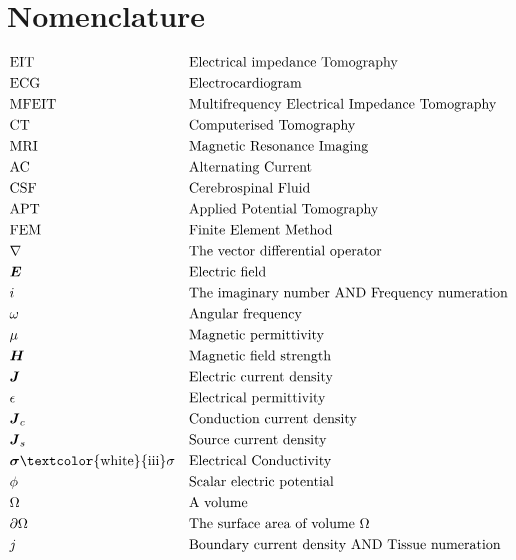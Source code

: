 
\chapter*{Nomenclature}
\begin{align*}
	&\text{EIT} &&\text{Electrical impedance Tomography}\\
	&\text{ECG} &&\text{Electrocardiogram}\\
	&\text{MFEIT} &&\text{Multifrequency Electrical Impedance Tomography}\\
	&\text{CT} &&\text{Computerised Tomography}\\
	&\text{MRI} &&\text{Magnetic Resonance Imaging}\\
	&\text{AC} &&\text{Alternating Current}\\
	&\text{CSF} &&\text{Cerebrospinal Fluid}\\
	&\text{APT} &&\text{Applied Potential Tomography}\\
	&\text{FEM} &&\text{Finite Element Method}\\
	&\nabla &&\text{The vector differential operator}\\
	&\boldsymbol{E} &&\text{Electric field}\\
	&i &&\text{The imaginary number AND Frequency numeration}\\
	&\omega &&\text{Angular frequency}\\
	&\mu &&\text{Magnetic permittivity}\\
	&\boldsymbol{H} &&\text{Magnetic field strength}\\
	&\boldsymbol{J} &&\text{Electric current density}\\
	&\epsilon &&\text{Electrical permittivity}\\
	&\boldsymbol{J}_c &&\text{Conduction current density}\\
	&\boldsymbol{J}_s &&\text{Source current density}\\
	&\boldsymbol{\sigma} \text{\textcolor{white}{iii}} \sigma &&\text{Electrical Conductivity}\\
	&\phi &&\text{Scalar electric potential}\\
	&\Omega &&\text{A volume}\\
	&\partial \Omega &&\text{The surface area of volume } \Omega \\
	&j &&\text{Boundary current density AND Tissue numeration}\\
\end{align*}

